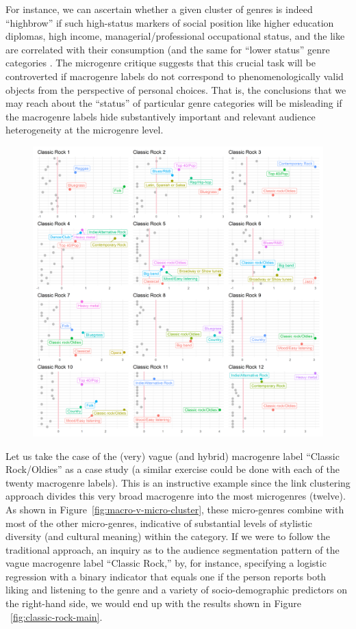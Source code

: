 \documentclass[a4paper,12pt]{extarticle}
\begin{document}
For instance, we can ascertain whether a given cluster of genres is indeed ``highbrow'' if such high-status markers of social position like higher education diplomas, high income, managerial/professional occupational status, and the like are correlated with their consumption (and the same for ``lower status'' genre categories \citep{bryson96}. The microgenre critique suggests that this crucial task will be controverted if macrogenre labels do not correspond to phenomenologically valid objects from the perspective of personal choices. That is, the conclusions that we may reach about the ``status'' of particular genre categories will be misleading if the macrogenre labels hide substantively important and relevant audience heterogeneity at the microgenre level.

\begin{figure}[ht!]
    \centering
    \includegraphics[width=1.0\textwidth]{Figs/Link Clust/classic-rock-fav.png}
    \caption{}
    \label{fig:fav}
\end{figure}

Let us take the case of the (very) vague (and hybrid) macrogenre label ``Classic Rock/Oldies'' as a case study (a similar exercise could be done with each of the twenty macrogenre labels). This is an instructive example since the link clustering approach divides this very broad macrogenre into the most microgenres (twelve). As shown in Figure~\ref{fig:macro-v-micro-cluster}, these micro-genres combine with most of the other micro-genres, indicative of substantial levels of stylistic diversity (and cultural meaning) within the category. If we were to follow the traditional approach, an inquiry as to the audience segmentation pattern of the vague macrogenre label ``Classic Rock,'' by, for instance, specifying a logistic regression with a binary indicator that equals one if the person reports both liking and listening to the genre and a variety of socio-demographic predictors on the right-hand side, we would end up with the results shown in Figure ~\ref{fig:classic-rock-main}. 
\end{document}
